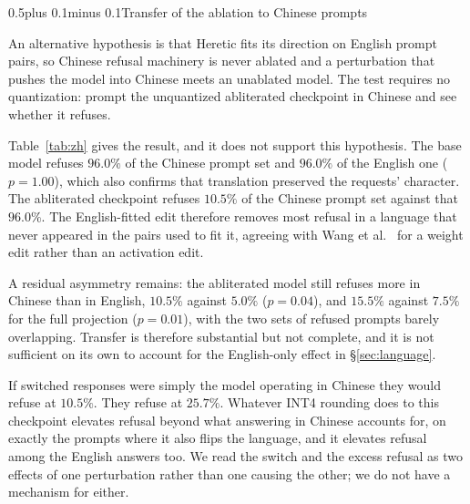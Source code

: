 \documentclass[conference,compsoc,letterpaper]{IEEEtran}
\makeatletter
\def\subsection{\@startsection{subsection}{2}{\z@}{1\baselineskip plus 0.25\baselineskip minus 0.25\baselineskip}%
{0.5\baselineskip plus 0.1\baselineskip minus 0.1\baselineskip}{\normalfont\sublargesize\bfseries}}%
\makeatother
\begin{document}
\subsection{Transfer of the ablation to Chinese prompts} \label{sec:zh}

\begin{table}[t]
\caption{Refusal rate ($\%$) on the same prompt set in English and in Chinese
translation, at BF16 with no quantization anywhere. This comparison uses the
first $200$ prompts, the ones that were translated, in both arms. $p$ is an
exact McNemar test between the two languages, paired by prompt.}
\label{tab:zh}
\centering\scriptsize

\end{table}

An alternative hypothesis is that Heretic fits its direction on English prompt pairs, so Chinese refusal machinery is never ablated and a perturbation that pushes the model into Chinese meets an unablated model. The test requires no quantization: prompt the unquantized abliterated checkpoint in Chinese and see whether it refuses.

Table~\ref{tab:zh} gives the result, and it does not support this hypothesis. The base model refuses $96.0\%$ of the Chinese prompt set and $96.0\%$ of the English one ($p=1.00$), which also confirms that translation preserved the requests' character. The abliterated checkpoint refuses $10.5\%$ of the Chinese prompt set against that $96.0\%$. The English-fitted edit therefore removes most refusal in a language that never appeared in the pairs used to fit it, agreeing with Wang et al.~\cite{wang2025universal} for a weight edit rather than an activation edit.

A residual asymmetry remains: the abliterated model still refuses more in Chinese than in English, $10.5\%$ against $5.0\%$ ($p=0.04$), and $15.5\%$ against $7.5\%$ for the full projection ($p=0.01$), with the two sets of refused prompts barely overlapping. Transfer is therefore substantial but not complete, and it is not sufficient on its own to account for the English-only effect in \S\ref{sec:language}.

If switched responses were simply the model operating in Chinese they would refuse at $10.5\%$. They refuse at $25.7\%$. Whatever INT4 rounding does to this checkpoint elevates refusal beyond what answering in Chinese accounts for, on exactly the prompts where it also flips the language, and it elevates refusal among the English answers too. We read the switch and the excess refusal as two effects of one perturbation rather than one causing the other; we do not have a mechanism for either.
\end{document}
